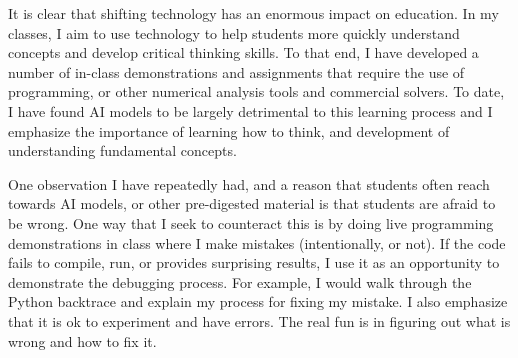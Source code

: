 It is clear that shifting technology has an enormous impact on education. In my classes, I aim to use technology to help students more quickly understand concepts and develop critical thinking skills. To that end, I have developed a number of in-class demonstrations and assignments that require the use of programming, or other numerical analysis tools and commercial solvers. To date, I have found AI models to be largely detrimental to this learning process and I emphasize the importance of learning how to think, and development of understanding fundamental concepts.

One observation I have repeatedly had, and a reason that students often reach towards AI models, or other pre-digested material is that students are afraid to be wrong. One way that I seek to counteract this is by doing live programming demonstrations in class where I make mistakes (intentionally, or not). If the code fails to compile, run, or provides surprising results, I use it as an opportunity to demonstrate the debugging process. For example, I would walk through the Python backtrace and explain my process for fixing my mistake. I also emphasize that it is ok to experiment and have errors. The real fun is in figuring out what is wrong and how to fix it.

